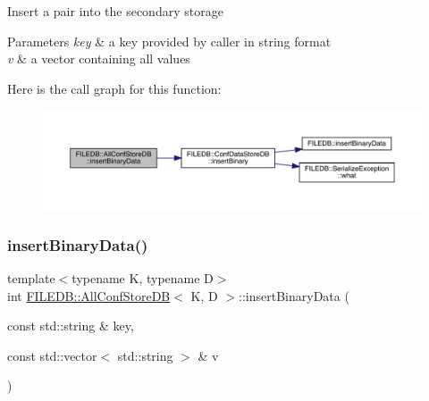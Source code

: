 Insert a pair into the secondary storage 
\begin{DoxyParams}{Parameters}
{\em key} & a key provided by caller in string format \\
\hline
{\em v} & a vector containing all values \\
\hline
\end{DoxyParams}
Here is the call graph for this function\+:
\nopagebreak
\begin{figure}[H]
\begin{center}
\leavevmode
\includegraphics[width=350pt]{df/db6/classFILEDB_1_1AllConfStoreDB_ac2c898624d4b32c526951edfb6271d60_cgraph}
\end{center}
\end{figure}
\mbox{\label{classFILEDB_1_1AllConfStoreDB_ac2c898624d4b32c526951edfb6271d60}} 
\subsubsection{\texorpdfstring{insertBinaryData()}{insertBinaryData()}\hspace{0.1cm}{\footnotesize\ttfamily [3/3]}}
{\footnotesize\ttfamily template$<$typename K, typename D$>$ \\
int \mbox{\hyperlink{classFILEDB_1_1AllConfStoreDB}{F\+I\+L\+E\+D\+B\+::\+All\+Conf\+Store\+DB}}$<$ K, D $>$\+::insert\+Binary\+Data (\begin{DoxyParamCaption}\item[{const std\+::string \&}]{key,  }\item[{const std\+::vector$<$ std\+::string $>$ \&}]{v }\end{DoxyParamCaption})\hspace{0.3cm}{\ttfamily [inline]}}

